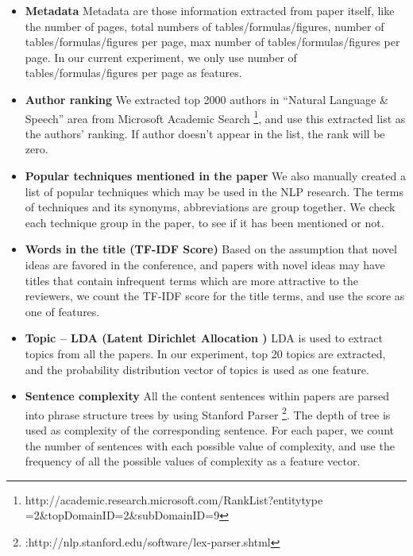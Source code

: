 \documentclass[11pt,letterpaper]{article}
\begin{document}
\begin{itemize} 
\item {\bf Metadata}
Metadata are those information extracted from paper itself, like the number of pages, total numbers of tables/formulas/figures, number of tables/formulas/figures per page, max number of tables/formulas/figures per page. In our current experiment, we only use number of tables/formulas/figures per page as features.

\item {\bf 	Author ranking}
We extracted top 2000 authors in ``Natural Language \& Speech'' area from Microsoft Academic Search \footnote{http://academic.research.microsoft.com/RankList?entitytype =2\&topDomainID=2\&subDomainID=9}, and use this extracted list as the authors' ranking. If author doesn't appear in the list, the rank will be zero.

\item {\bf 	Popular techniques mentioned in the paper}
We also manually created a list of popular techniques which may be used in the NLP research. The terms of techniques and its synonyms, abbreviations are group together. We check each technique group in the paper, to see if it has been mentioned or not.

\item {\bf Words in the title (TF-IDF Score)}
Based on the assumption that novel ideas are favored in the conference, and papers with novel ideas may have titles that contain infrequent terms which are more attractive to the reviewers, we count the TF-IDF score for the title terms, and use the score as one of features.

\item {\bf Topic – LDA (Latent Dirichlet Allocation )}
LDA is used to extract topics from all the papers. In our experiment, top 20 topics are extracted, and the probability distribution vector of topics is used as one feature. 

\item {\bf 	Sentence complexity}
All the content sentences within papers are parsed into phrase structure trees by using Stanford Parser \footnote{:http://nlp.stanford.edu/software/lex-parser.shtml}. The depth of tree is used as complexity of the corresponding sentence.  
For each paper, we count the number of sentences with each possible value of complexity,
and use the frequency of all the possible values of complexity as a feature vector.
\end{itemize}
\end{document}
